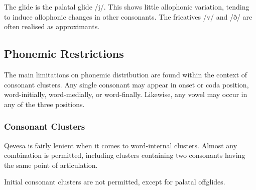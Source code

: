 \documentclass[grammar]{subfiles}
\begin{document}
  The glide is the palatal glide /j/.  This shows little allophonic variation, tending to induce allophonic changes in other consonants.  The fricatives /v/ and /ð/ are often realised as approximants.  

  \subsection{Phonemic Restrictions}
  \label{ssec:phonemic_restrictions}

  The main limitations on phonemic distribution are found within the context of consonant clusters.  Any single consonant may appear in onset or coda position, word-initially, word-medially, or word-finally.  Likewise, any vowel may occur in any of the three positions. 

  \subsubsection{Consonant Clusters}
  \label{sssec:consonant_clusters}

  Qevesa is fairly lenient when it comes to word-internal clusters. 
  Almost any combination is permitted, including clusters containing two consonants having the same point of articulation. 


  Initial consonant clusters are not permitted, except for palatal offglides.
\end{document}
